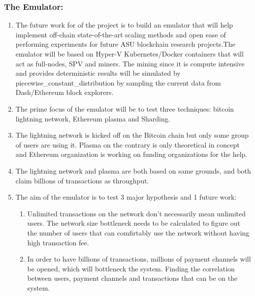 \documentclass[journal,12pt,onecolumn,draftclsnofoot,]{IEEEtran}
\begin{document}
    \subsubsection{The Emulator: } 
    \begin{enumerate}[label=(\alph*)]

        \item The future work for of the project is to build an emulator that
            will help implement off-chain state-of-the-art scaling methods and
            open ease of performing experiments for future ASU blockchain
            research projects.The emulator will be based on Hyper-V
            Kubernetes/Docker containers that will act as full-nodes, SPV and
            miners. The mining since it is compute intensive and provides
            deterministic results will be simulated by
            piecewise\_constant\_distribution by sampling the current data from
            Dash/Ethereum block explorers. 

        \item The prime focus of the emulator will be to test three techniques:
            bitcoin lightning network, Ethereum plasma and Sharding. 

        \item The lightning network is kicked off on the Bitcoin chain but only
            some group of users are using it. Plasma on the contrary is only
            theoretical in concept and Ethereum organization is working on
            funding organizations for the help. 

        \item The lightning network and plasma are both based on same grounds,
            and both claim billions of transactions as throughput.

        \item The aim of the emulator is to test 3 major hypothesis and 1 future
            work:
            \begin{enumerate}
                \item Unlimited transactions on the network don't necessarily
                    mean unlimited users. The network size bottleneck needs to
                    be calculated to figure out the number of users that can
                    comfirtably use the network without having high transaction
                    fee.

                \item In order to have billions of transactions, millions of
                    payment channels will be opened, which will bottleneck the
                    system. Finding the correlation between users, payment
                    channels and transactions that can be on the system.


\end{enumerate}
\end{enumerate}
\end{document}

